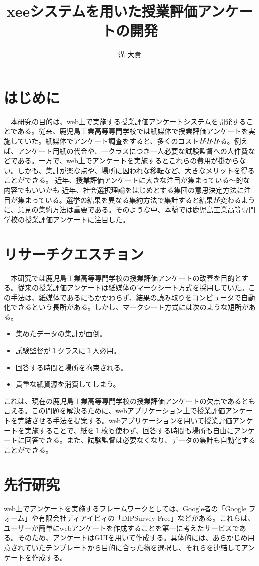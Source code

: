 \documentclass[11pt,a4paper]{jsarticle}
\title{xeeシステムを用いた授業評価アンケートの開発}
\author{溝 大貴}
\begin{document}
\maketitle
%
%
\section{はじめに}
　本研究の目的は、web上で実施する授業評価アンケートシステムを開発することである。従来、鹿児島工業高等専門学校では紙媒体で授業評価アンケートを実施していた。紙媒体でアンケート調査をすると、多くのコストがかかる。例えば、アンケート用紙の代金や、一クラスにつき一人必要な試験監督への人件費などである。一方で、web上でアンケートを実施するとこれらの費用が掛からない。しかも、集計が楽な点や、場所に囚われな移転など、大きなメリットを得ることができる。
近年、授業評価アンケートに大きな注目が集まっている～的な内容でもいいかも
近年、社会選択理論をはじめとする集団の意思決定方法に注目が集まっている。選挙の結果を異なる集約方法で集計すると結果が変わるように、意見の集約方法は重要である。そのような中、本稿では鹿児島工業高等専門学校の授業評価アンケートに注目した。

\section{リサーチクエスチョン}
　本研究では鹿児島工業高等専門学校の授業評価アンケートの改善を目的とする。従来の授業評価アンケートは紙媒体のマークシート方式を採用していた。この手法は、紙媒体であるにもかかわらず、結果の読み取りをコンピュータで自動化できるという長所がある。しかし、マークシート方式には次のような短所がある。
\begin{itemize}
  \item 集めたデータの集計が面倒。 
  \item 試験監督が１クラスに１人必用。 
  \item 回答する時間と場所を拘束される。
  \item 貴重な紙資源を消費してしまう。
\end{itemize}
これは、現在の鹿児島工業高等専門学校の授業評価アンケートの欠点であるとも言える。この問題を解決るために、webアプリケーション上で授業評価アンケートを完結させる手法を提案する。webアプリケーションを用いて授業評価アンケートを実施することで、紙を１枚も使わず、回答する時間も場所も自由にアンケートに回答できる。また、試験監督は必要なくなり、データの集計も自動化することができる。
\section{先行研究}
web上でアンケートを実施するフレームワークとしては、Google者の「Google フォーム」や有限会社ディアイピィの「DIPSurvey-Free」などがある。これらは、ユーザーが簡単にwebアンケートを作成することを第一に考えたサービスである。そのため、アンケートはGUIを用いて作成する。具体的には、あらかじめ用意されていたテンプレートから目的に合った物を選択し、それらを連結してアンケートを作成する。
\end{document}
